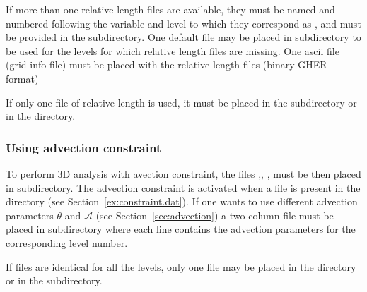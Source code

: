 If more than one relative length files are available, they must be  named and numbered following the variable and level to which they correspond as , and must be provided in the  subdirectory. One default file  may be placed in  subdirectory to be used for the levels for which relative length files are missing. One  ascii file (grid info file) must be placed with the relative length files (binary GHER format)

If only one  file of relative length is used, it must be placed in the  subdirectory or in the  directory.

\begin{center}
\end{center}


\subsubsection{Using advection constraint\label{advconstuse}}

To perform 3D analysis with avection constraint, the files ,\linebreak {}, , must be then placed in  subdirectory. The advection constraint is activated when a  file is present in the  directory (see Section~\ref{ex:constraint.dat}). If one wants to use different advection parameters $\theta$ and $\mathcal{A}$ (see Section~\ref{sec:advection}) a two column  file must be placed in  subdirectory where each line contains the advection parameters for the corresponding level number.

If  files are identical for all the levels, only one file  may be placed in the  directory or in the  subdirectory.

